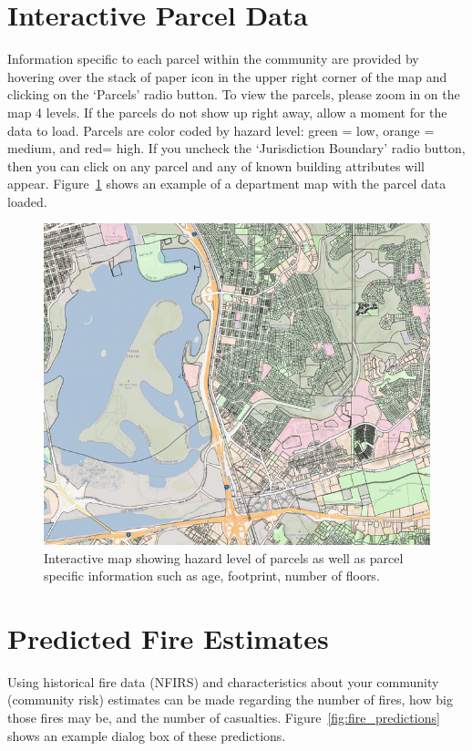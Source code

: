\documentclass[12pt,oneside]{book}
\begin{document}
\FloatBarrier

\section{Interactive Parcel Data}

Information specific to each parcel within the community are provided by hovering over the stack of paper icon in the upper right corner of the map and clicking on the `Parcels' radio button. To view the parcels, please zoom in on the map 4 levels. If the parcels do not show up right away, allow a moment for the data to load. Parcels are color coded by hazard level: green = low, orange = medium, and red= high. If you uncheck the `Jurisdiction Boundary' radio button, then you can click on any parcel and any of known building attributes will appear. Figure~\ref{fig:parcel_data} shows an example of a department map with the parcel data loaded.

\begin{figure}[ht!]
\centering
\includegraphics[width=.9\columnwidth]{Figures/parcel_data}
\caption{Interactive map showing hazard level of parcels as well as parcel specific information such as age, footprint, number of floors.}
\label{fig:parcel_data}
\end{figure}

\FloatBarrier

\section{Predicted Fire Estimates}

Using historical fire data (NFIRS) and characteristics about your community (community risk) estimates can be made regarding the number of fires, how big those fires may be, and the number of casualties. Figure~\ref{fig:fire_predictions} shows an example dialog box of these predictions.
\end{document}
